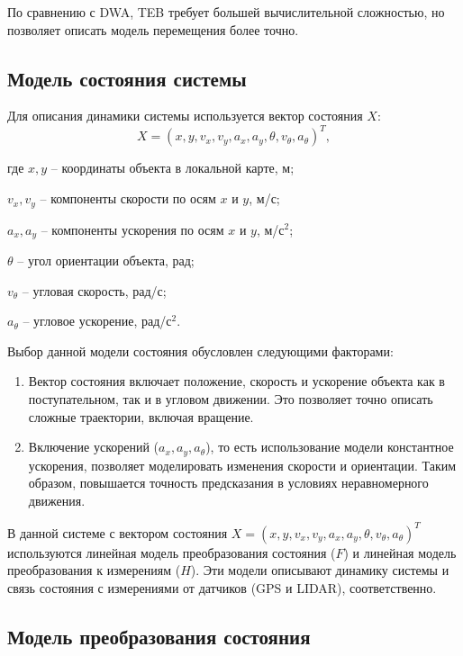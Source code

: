 По сравнению с DWA, TEB требует большей вычислительной сложностью,
но позволяет описать модель перемещения более точно. 


\subsection{Модель состояния системы}

Для описания динамики системы используется вектор состояния \(X\):
\[
{X} = (x, y, v_x, v_y, a_x, a_y, \theta, v_\theta, a_\theta)^T,
\]

\begin{explanationx}
\item[где] $x, y$ -- координаты объекта в локальной карте, м;
\item $v_x, v_y$ -- компоненты скорости по осям $x$ и $y$, м/с;
\item $a_x, a_y$ -- компоненты ускорения по осям $x$ и $y$, м/с${}^2$;
\item $\theta$ -- угол ориентации объекта, $рад$;
\item $v_\theta$ -- угловая скорость, рад/с;
\item $a_\theta$ -- угловое ускорение, рад/с${}^2$.
\end{explanationx}

Выбор данной модели состояния обусловлен следующими факторами:
\begin{enumerate}[label=\arabic*]
    \item Вектор состояния включает положение, скорость и ускорение объекта как в поступательном, так и в угловом движении. 
	   Это позволяет точно описать сложные траектории, включая вращение.
    \item Включение ускорений ($a_x, a_y, a_\theta$), то есть использование модели константное ускорения,
	  позволяет моделировать изменения скорости и ориентации. Таким образом,
	повышается точность предсказания в условиях неравномерного движения.
\end{enumerate}

В данной системе с вектором состояния 
\({X} = (x, y, v_x, v_y, a_x, a_y, \theta, v_\theta, a_\theta)^T\)
используются линейная модель преобразования состояния (\(F\)) и линейная модель преобразования к измерениям (\(H\)).
Эти модели описывают динамику системы и связь состояния с измерениями от датчиков (GPS и LIDAR), соответственно.

\subsection{Модель преобразования состояния}
\label{subsec:state_transition}


